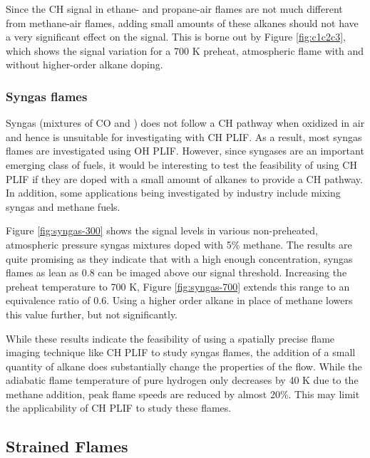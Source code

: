 


Since the CH signal in ethane- and propane-air flames are not much different from methane-air flames, adding small amounts of these alkanes should not have a very significant effect on the signal.
This is borne out by Figure \ref{fig:c1c2c3}, which shows the signal variation for a 700 K preheat, atmospheric flame with and without higher-order alkane doping.



\subsubsection{Syngas flames}

Syngas (mixtures of CO and ) does not follow a CH pathway when oxidized in air and hence is unsuitable for investigating with CH PLIF.
As a result, most syngas flames are investigated using OH PLIF.
However, since syngases are an important emerging class of fuels, it would be interesting to test the feasibility of using CH PLIF if they are doped with a small amount of alkanes to provide a CH pathway. In addition, some applications being investigated by industry include mixing syngas and methane fuels.

Figure \ref{fig:syngas-300} shows the signal levels in various non-preheated, atmospheric pressure syngas mixtures doped with 5\% methane.
The results are quite promising as they indicate that with a high enough  concentration, syngas flames as lean as 0.8 can be imaged above our signal threshold.
Increasing the preheat temperature to 700 K, Figure \ref{fig:syngas-700} extends this range to an equivalence ratio of 0.6.
Using a higher order alkane in place of methane lowers this value further, but not significantly.




While these results indicate the feasibility of using a spatially precise flame imaging technique like CH PLIF to study syngas flames, the addition of a small quantity of alkane does substantially change the properties of the flow.
While the adiabatic flame temperature of pure hydrogen only decreases by 40 K due to the methane addition, peak flame speeds are reduced by almost 20\%.
This may limit the applicability of CH PLIF to study these flames.

\subsection{Strained Flames}

